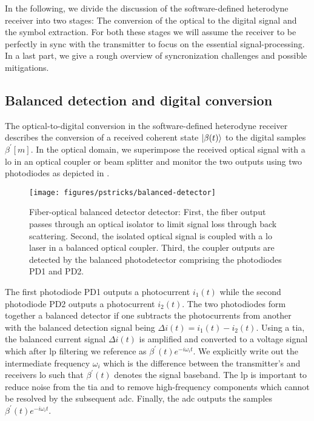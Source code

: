 In the following, we divide the discussion of the software-defined heterodyne receiver into two stages:
The conversion of the optical to the digital signal and the symbol extraction.
For both these stages we will assume the receiver to be perfectly in sync with the transmitter to focus on the essential signal-processing.
In a last part, we give a rough overview of syncronization challenges and possible mitigations.

\subsection{Balanced detection and digital conversion}

The optical-to-digital conversion in the software-defined heterodyne receiver describes the conversion of a received coherent state $\lvert\beta(t)\rangle$ to the digital samples $\beta^\prime[m]$.
In the optical domain, we superimpose the received optical signal with a \gls{lo} in an optical coupler or beam splitter and monitor the two outputs using two photodiodes as depicted in .
\begin{figure}[htb]
	\centering
	\texttt{[image: figures/pstricks/balanced-detector]}
	\caption{Fiber-optical balanced detector detector: First, the fiber output passes through an optical isolator to limit signal loss through back scattering. Second, the isolated optical signal is coupled with a \gls{lo} laser in a balanced optical coupler. Third, the coupler outputs are detected by  the balanced photodetector comprising the photodiodes PD1 and PD2.}\label{fig:fiber_optical_balanced_detector}
\end{figure}
The first photodiode PD1 outputs a photocurrent $i_1(t)$ while the second photodiode PD2 outputs a photocurrent $i_2(t)$.
The two photodiodes form together a balanced detector if one subtracts the photocurrents from another with the balanced detection signal being $\Delta i(t)=i_1(t)-i_2(t)$.
Using a \gls{tia}, the balanced current signal $\Delta i(t)$ is amplified and converted to a voltage signal which after \gls{lp} filtering we reference as $\beta^\prime(t)e^{-i\omega_i t}$.
We explicitly write out the intermediate frequency $\omega_i$ which is the difference between the transmitter's and receivers \gls{lo} such that $\beta^\prime(t)$ denotes the signal baseband.
The \gls{lp} is important to reduce noise from the \gls{tia} and to remove high-frequency components which cannot be resolved by the subsequent \gls{adc}.
Finally, the \gls{adc} outputs the samples $\beta^\prime(t)e^{-i\omega_it}$.
